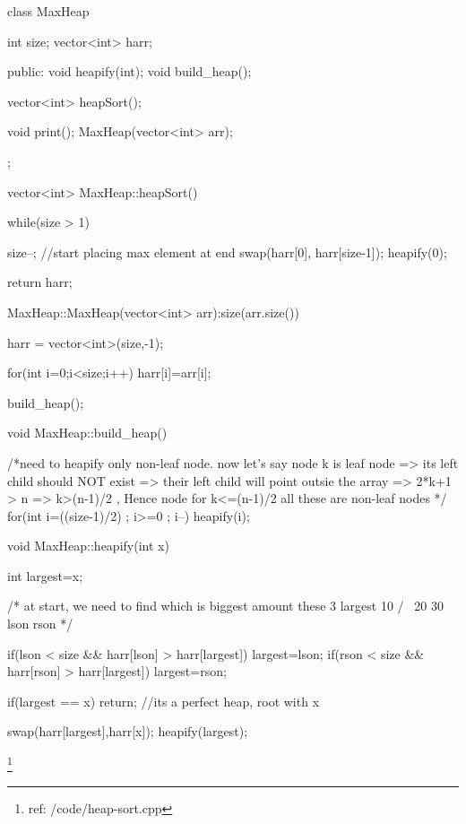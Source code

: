 \begin{code3}
     class MaxHeap{
        int size;
        vector<int> harr;
         
    public:
         void heapify(int);
         void build_heap();
    
         vector<int> heapSort();
         
         void print();
         MaxHeap(vector<int> arr);          
    };
    
    vector<int> MaxHeap::heapSort(){
    
        while(size > 1){

          size--;   
          //start placing max element at end       
          swap(harr[0], harr[size-1]); 
          heapify(0);
        }

        return harr;
    }
    
    
    MaxHeap::MaxHeap(vector<int> arr):size(arr.size()){
        
        harr = vector<int>(size,-1);
    
         for(int i=0;i<size;i++)
              harr[i]=arr[i];
         
         build_heap();
    }
    
    void MaxHeap::build_heap(){
         
        /*need to heapify only non-leaf node. now let's say node k is leaf node => its left child should NOT exist => their left child will point outsie the array =>  2*k+1 > n
        => k>(n-1)/2 , Hence node for k<=(n-1)/2 all these are non-leaf nodes */
         for(int i=((size-1)/2) ; i>=0 ; i--){
              heapify(i);
         }
    }
    
    void MaxHeap::heapify(int x){
         int largest=x;
    
    /* at start, we need to find which is biggest amount these 3
                 largest
                    10
                   /  \
                 20    30
                lson   rson
    */
    
        
        if(lson < size && harr[lson] > harr[largest]) largest=lson;
        if(rson < size && harr[rson] > harr[largest]) largest=rson;
    
        if(largest == x) return; //its a perfect heap, root with x
    
        swap(harr[largest],harr[x]); 
        heapify(largest);
    }
\end{code3}
\footnote{ref: /code/heap-sort.cpp}



